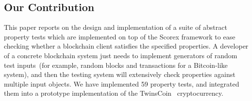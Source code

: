 
\subsection{Our Contribution}

This paper reports on the design and implementation of a suite of abstract property tests which are implemented on top of the Scorex framework to ease checking whether a blockchain client satisfies the specified properties. A developer of a concrete blockchain system just needs to implement generators of random test inputs~(for example, random blocks and transactions for a Bitcoin-like system), and then the testing system will extensively check properties against multiple input objects. We have implemented 59 property tests, and integrated them into a prototype implementation of the TwinsCoin~\cite{cryptoeprint:2017:232} cryptocurrency.  
